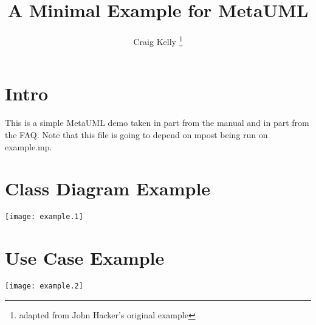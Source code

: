 \documentclass[letterpaper,10pt]{article}
\title{A Minimal Example for MetaUML}
\author{Craig Kelly \footnote{adapted from John Hacker's original example} }
\begin{document}
\maketitle

\section{Intro}

This is a simple MetaUML demo taken in part from the manual and in
part from the FAQ.  Note that this file is going to depend on mpost
being run on example.mp.

\section{Class Diagram Example}

\texttt{[image: example.1]}

\section{Use Case Example}

\texttt{[image: example.2]}
\end{document}
